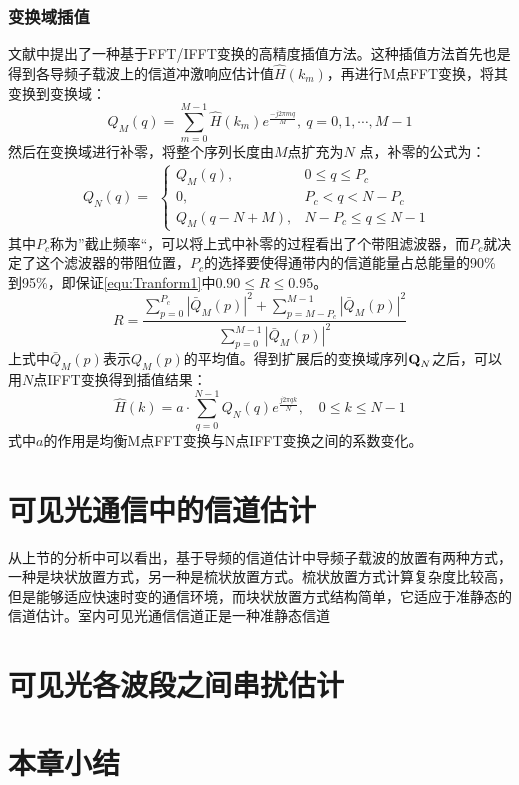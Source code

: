 \subsubsection{变换域插值}
文献中提出了一种基于FFT/IFFT变换的高精度插值方法。这种插值方法首先也是得到各导频子载波上的信道冲激响应估计值$\hat{H}(k_m)$，再进行M点FFT变换，将其变换到变换域：
\begin{equation}
Q_M(q)=\sum_{m=0}^{M-1}\hat{H}(k_m)e^{\frac{-j2\pi mq}{M}},\ q=0,1,\cdots,M-1
\end{equation}
然后在变换域进行补零，将整个序列长度由$M$点扩充为$N$ 点，补零的公式为：
\begin{equation}
Q_N(q)=
\begin{aligned}
\begin{cases}
Q_M(q), &0\leq q \leq P_c \\
0, &P_c < q < N-P_c \\
Q_M(q-N+M),&N-P_c \leq  q \leq N-1
\end{cases}
\end{aligned}
\end{equation}
其中$P_c$称为”截止频率“，可以将上式中补零的过程看出了个带阻滤波器，而$P_c$就决定了这个滤波器的带阻位置，$P_c$的选择要使得通带内的信道能量占总能量的90\% 到95\%，即保证\ref{equ:Tranform1}中$0.90\leq R \leq 0.95$。
\begin{equation}
R=\frac{\sum_{p=0}^{P_c}|\bar{Q}_M(p)|^2+\sum_{p=M-P_c}^{M-1}|\bar{Q}_M(p)|^2}{\sum_{p=0}^{M-1}|\bar{Q}_M(p)|^2}
\label{equ:Tranform1}
\end{equation}
上式中$\bar{Q}_M(p)$表示$Q_M(p)$的平均值。得到扩展后的变换域序列$\textbf Q_N$之后，可以用$N$点IFFT变换得到插值结果：
\begin{equation}
\hat{H}(k) = a\cdot \sum_{q=0}^{N-1}Q_N(q)e^{\frac{j2\pi qk}{N}}, \quad 0\leq k \leq N-1
\end{equation}
式中$a$的作用是均衡M点FFT变换与N点IFFT变换之间的系数变化。
\section{可见光通信中的信道估计}
从上节的分析中可以看出，基于导频的信道估计中导频子载波的放置有两种方式，一种是块状放置方式，另一种是梳状放置方式。梳状放置方式计算复杂度比较高，但是能够适应快速时变的通信环境，而块状放置方式结构简单，它适应于准静态的信道估计。室内可见光通信信道正是一种准静态信道
\section{可见光各波段之间串扰估计}
\section{本章小结}

